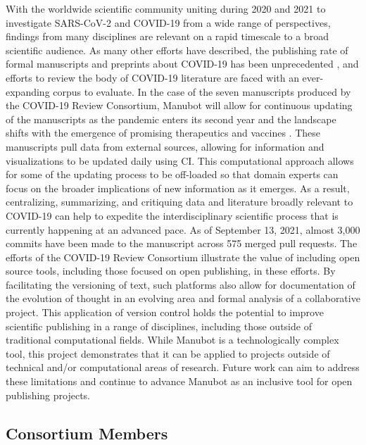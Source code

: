 \documentclass[twocolumn]{ceurart}
\begin{document}
With the worldwide scientific community uniting during 2020 and 2021 to investigate SARS-CoV-2 and COVID-19 from a wide range of perspectives, findings from many disciplines are relevant on a rapid timescale to a broad scientific audience.
As many other efforts have described, the publishing rate of formal manuscripts and preprints about COVID-19 has been unprecedented \citep{7ub6VM4Z}, and efforts to review the body of COVID-19 literature are faced with an ever-expanding corpus to evaluate.
In the case of the seven manuscripts produced by the COVID-19 Review Consortium, Manubot will allow for continuous updating of the manuscripts as the pandemic enters its second year and the landscape shifts with the emergence of promising therapeutics and vaccines \citep{cifK9B8t, i2CGFwI3}.
These manuscripts pull data from external sources, allowing for information and visualizations to be updated daily using CI.
This computational approach allows for some of the updating process to be off-loaded so that domain experts can focus on the broader implications of new information as it emerges.
As a result, centralizing, summarizing, and critiquing data and literature broadly relevant to COVID-19 can help to expedite the interdisciplinary scientific process that is currently happening at an advanced pace.
As of September 13, 2021, almost 3,000 commits have been made to the manuscript across 575 merged pull requests.
The efforts of the COVID-19 Review Consortium illustrate the value of including open source tools, including those focused on open publishing, in these efforts.
By facilitating the versioning of text, such platforms also allow for documentation of the evolution of thought in an evolving area and formal analysis of a collaborative project.
This application of version control holds the potential to improve scientific publishing in a range of disciplines, including those outside of traditional computational fields.
While Manubot is a technologically complex tool, this project demonstrates that it can be applied to projects outside of technical and/or computational areas of research.
Future work can aim to address these limitations and continue to advance Manubot as an inclusive tool for open publishing projects.

\hypertarget{consortium-members}{%
\subsection*{Consortium Members}\label{consortium-members}}
\end{document}
